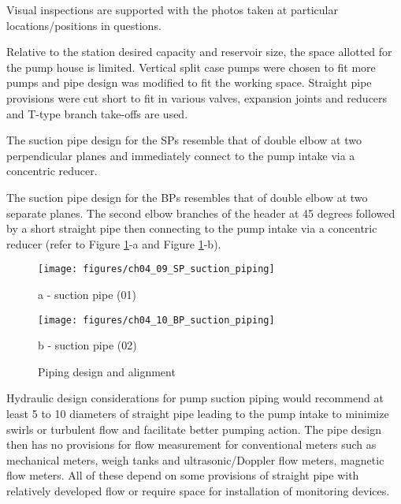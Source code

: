 Visual inspections are supported with the photos taken at particular locations/positions in questions.

Relative to the station desired capacity and reservoir size, the space allotted for the pump house is limited. Vertical split case pumps were chosen to fit more pumps and pipe design was modified to fit the working space. Straight pipe provisions were cut short to fit in various valves, expansion joints and reducers and T-type branch take-offs are used. 

The suction pipe design for the SPs resemble that of double elbow at two perpendicular planes and immediately connect to the pump intake via a concentric reducer. 

The suction pipe design for the BPs resembles that of double elbow at two separate planes. The second elbow branches of the header at 45 degrees followed by a short straight pipe then connecting to the pump intake via a concentric reducer (refer to Figure \ref{ch04_piping01}-a and Figure \ref{ch04_piping01}-b).


\begin{figure}[!htb]
	\begin{minipage}[b]{0.4\linewidth}
		\centering
		\texttt{[image: figures/ch04\_09\_SP\_suction\_piping]}
		\caption*{a - suction pipe (01)}
	\end{minipage}
	\hspace{0.05cm}
	\begin{minipage}[b]{0.5\linewidth}
		\centering
		\texttt{[image: figures/ch04\_10\_BP\_suction\_piping]}
		\caption*{b - suction pipe (02)}
	\end{minipage}

\caption{Piping design and alignment}
\label{ch04_piping01}
\end{figure}


Hydraulic design considerations for pump suction piping would recommend at least 5 to 10 diameters of straight pipe leading to the pump intake to minimize swirls or turbulent flow and facilitate better pumping action. The pipe design then has no provisions for flow measurement for conventional meters such as mechanical meters, weigh tanks and ultrasonic/Doppler flow meters, magnetic flow meters. All of these depend on some provisions of straight pipe with relatively developed flow or require space for installation of monitoring devices. 

